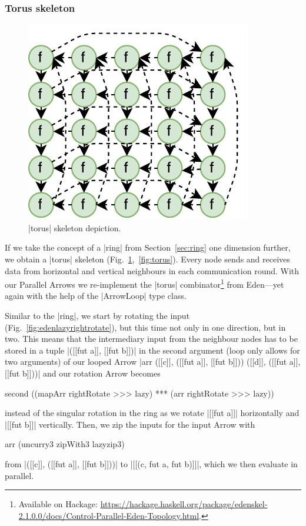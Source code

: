 \subsubsection{Torus skeleton}\label{sec:torus}
\begin{figure}
	\includegraphics[scale=0.75]{images/torus}
	\caption{|torus| skeleton depiction.}
	\label{fig:ringTorusImg}
\end{figure}
If we take the concept of a |ring| from Section~\ref{sec:ring} one dimension further, we obtain a |torus| skeleton (Fig.~\ref{fig:ringTorusImg},~\ref{fig:torus}). Every node sends and receives data from horizontal and vertical neighbours in each communication round.
With our Parallel Arrows we re-implement the |torus| combinator\footnote{Available on Hackage: \url{https://hackage.haskell.org/package/edenskel-2.1.0.0/docs/Control-Parallel-Eden-Topology.html}.} from Eden---yet again with the help of the |ArrowLoop| type class.

Similar to the |ring|, we start by rotating the input (Fig.~\ref{fig:edenlazyrightrotate}), but this time not only in one direction, but in two. This means that the intermediary input from the neighbour nodes has to be stored in a tuple |([[fut a]], [[fut b]])| in the second argument (loop only allows for two arguments) of our looped Arrow |arr ([[c]], ([[fut a]], [[fut b]])) ([[d]], ([[fut a]], [[fut b]]))| and our rotation Arrow becomes 
\begin{code}
second ((mapArr rightRotate >>> lazy) *** (arr rightRotate >>> lazy))
\end{code}
instead of the singular rotation in the ring as we rotate |[[fut a]]| horizontally and |[[fut b]]| vertically. Then, we zip the inputs for the input Arrow with 
\begin{code}
arr (uncurry3 zipWith3 lazyzip3)
\end{code}
from |([[c]], ([[fut a]], [[fut b]]))| to |[[(c, fut a, fut b)]]|, which we then evaluate in parallel.

